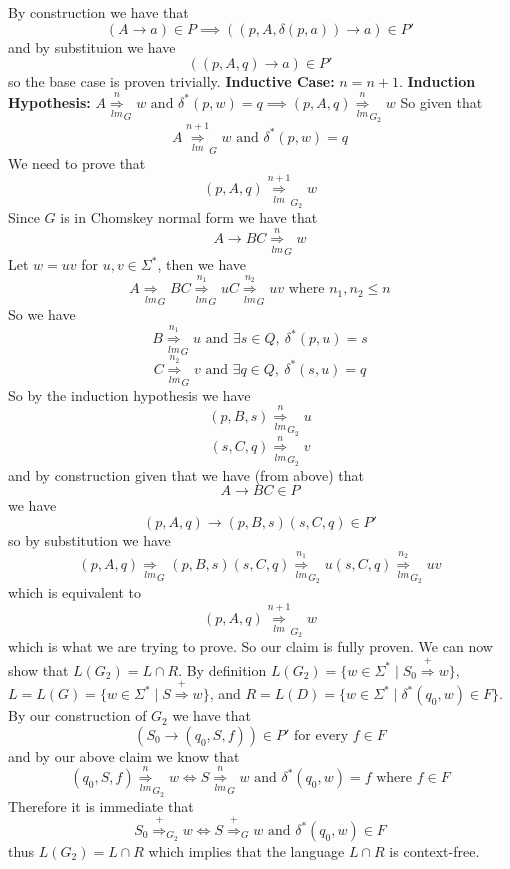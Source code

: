 \documentclass[12pt]{article}
\begin{document}
By construction we have that
$$(A \rightarrow a) \in P \implies ((p,A,\delta(p,a)) \rightarrow a) \in P'$$
and by substituion we have
$$((p,A,q) \rightarrow a) \in P'$$
so the base case is proven trivially.
\medskip \newline
\textbf{Inductive Case: } $n = n+1$.
\newline \textbf{Induction Hypothesis: }
$A \underset{lm}{\overset{n}{\Longrightarrow}}_{G} w
\text{ and } \delta^*(p,w) = q \implies
(p,A,q) \underset{lm}{\overset{n}{\Longrightarrow}}_{G_2} w$
\medskip \newline
So given that
$$A \underset{lm}{\overset{n+1}{\Longrightarrow}}_{G} w
\text{ and } \delta^*(p,w) = q$$
We need to prove that
$$(p,A,q) \underset{lm}{\overset{n+1}{\Longrightarrow}}_{G_2} w$$
Since $G$ is in Chomskey normal form we have that
$$A \rightarrow BC \underset{lm}{\overset{n}{\Longrightarrow}}_{G} w$$
Let $w =uv$ for $u,v\in \Sigma^*$, then we have
$$A \underset{lm}{\Longrightarrow}_{G} BC
\underset{lm}{\overset{n_1}{\Longrightarrow}}_{G} uC
\underset{lm}{\overset{n_2}{\Longrightarrow}}_{G} uv
\text{ where } n_1,n_2\le n$$
So we have
$$B \underset{lm}{\overset{n_1}{\Longrightarrow}}_{G} u
\text{ and } \exists s\in Q,\ \delta^*(p,u) = s$$
$$C \underset{lm}{\overset{n_2}{\Longrightarrow}}_{G} v
\text{ and } \exists q\in Q,\ \delta^*(s,u) = q$$
So by the induction hypothesis we have
$$(p,B,s) \underset{lm}{\overset{n}{\Longrightarrow}}_{G_2} u$$
$$(s,C,q) \underset{lm}{\overset{n}{\Longrightarrow}}_{G_2} v$$
and by construction given that we have (from above) that
$$A \rightarrow BC \in P$$
we have
$$(p,A,q) \rightarrow (p,B,s)(s,C,q) \in P'$$
so by substitution we have
$$(p,A,q) \underset{lm}{\Longrightarrow}_{G} (p,B,s)(s,C,q)
\underset{lm}{\overset{n_1}{\Longrightarrow}}_{G_2} u(s,C,q)
\underset{lm}{\overset{n_2}{\Longrightarrow}}_{G_2} uv$$
which is equivalent to
$$(p,A,q) \underset{lm}{\overset{n+1}{\Longrightarrow}}_{G_2} w$$
which is what we are trying to prove. So our claim is fully proven.
We can now show that $L(G_2) = L\cap R$. By definition
$L(G_2) = \{w \in \Sigma^* \mid S_0 \overset{+}{\Longrightarrow} w\}$,
$L = L(G) = \{w \in \Sigma^* \mid S \overset{+}{\Longrightarrow} w\}$, and
$R = L(D) = \{w \in \Sigma^* \mid \delta^*(q_0,w) \in F\}$. By our
construction of $G_2$ we have that
$$(S_0 \rightarrow (q_0,S,f)) \in P' \text{ for every } f \in F$$
and by our above claim we know that
$$(q_0,S,f) \underset{lm}{\overset{n}{\Longrightarrow}}_{G_2} w \iff
S \underset{lm}{\overset{n}{\Longrightarrow}}_{G} w
\text{ and } \delta^*(q_0,w) = f \text{ where } f\in F$$
Therefore it is immediate that
$$ S_0 \overset{+}{\Longrightarrow}_{G_2} w \iff
S \overset{+}{\Longrightarrow}_{G} w \text{ and } \delta^*(q_0,w) \in F$$
thus $L(G_2) = L\cap R$ which implies that the language $L\cap R$ is
context-free.
\end{document}
